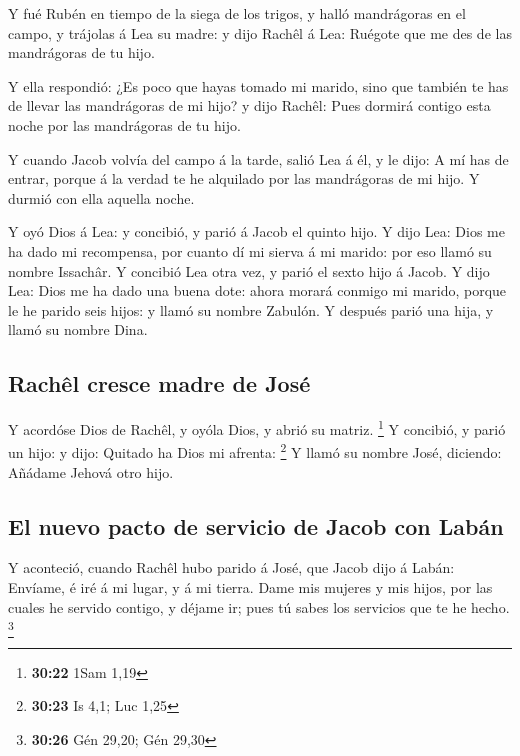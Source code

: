  Y fué Rubén en tiempo de la siega de los trigos, y halló
mandrágoras en el campo, y trájolas á Lea su madre: y dijo Rachêl á Lea:
Ruégote que me des de las mandrágoras de tu hijo.

 Y ella respondió: ¿Es poco que hayas tomado mi marido,
sino que también te has de llevar las mandrágoras de mi hijo? y dijo
Rachêl: Pues dormirá contigo esta noche por las mandrágoras de tu hijo.

 Y cuando Jacob volvía del campo á la tarde, salió Lea á
él, y le dijo: A mí has de entrar, porque á la verdad te he alquilado
por las mandrágoras de mi hijo. Y durmió con ella aquella noche.

 Y oyó Dios á Lea: y concibió, y parió á Jacob el quinto
hijo.  Y dijo Lea: Dios me ha dado mi recompensa, por
cuanto dí mi sierva á mi marido: por eso llamó su nombre Issachâr.
 Y concibió Lea otra vez, y parió el sexto hijo á Jacob.
 Y dijo Lea: Dios me ha dado una buena dote: ahora morará
conmigo mi marido, porque le he parido seis hijos: y llamó su nombre
Zabulón.  Y después parió una hija, y llamó su nombre Dina.

\hypertarget{rachuxeal-cresce-madre-de-josuxe9}{%
\subsection{Rachêl cresce madre de
José}\label{rachuxeal-cresce-madre-de-josuxe9}}

 Y acordóse Dios de Rachêl, y oyóla Dios, y abrió su
matriz. \footnote{\textbf{30:22} 1Sam 1,19}  Y concibió, y
parió un hijo: y dijo: Quitado ha Dios mi afrenta: \footnote{\textbf{30:23}
  Is 4,1; Luc 1,25}  Y llamó su nombre José, diciendo:
Añádame Jehová otro hijo.

\hypertarget{el-nuevo-pacto-de-servicio-de-jacob-con-labuxe1n}{%
\subsection{El nuevo pacto de servicio de Jacob con
Labán}\label{el-nuevo-pacto-de-servicio-de-jacob-con-labuxe1n}}

 Y aconteció, cuando Rachêl hubo parido á José, que Jacob
dijo á Labán: Envíame, é iré á mi lugar, y á mi tierra. 
Dame mis mujeres y mis hijos, por las cuales he servido contigo, y
déjame ir; pues tú sabes los servicios que te he hecho. \footnote{\textbf{30:26}
  Gén 29,20; Gén 29,30}

